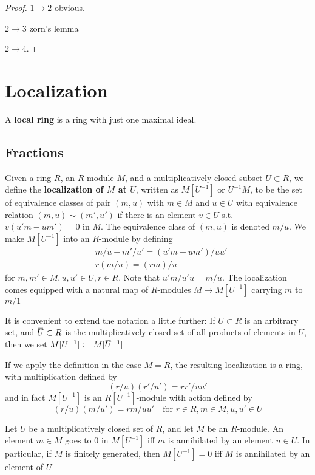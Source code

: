 \documentclass[11pt]{article}
\begin{document}
\begin{proof}
\(1\to 2\) obvious.

\(2\to 3\) zorn's lemma

\(2\to 4\).
\end{proof}
\section{Localization}
\label{sec:orgf3b943d}
A \textbf{local ring} is a ring with just one maximal ideal.
\subsection{Fractions}
\label{sec:orgc443fe5}
Given a ring \(R\), an \(R\)-module \(M\), and a multiplicatively closed
subset \(U\subset R\), we define the \textbf{localization of \(M\) at \(U\)}, written
as \(M[U^{-1}]\) or \(U^{-1}M\), to be the set of equivalence classes of pair
\((m,u)\) with \(m\in M\) and \(u\in U\) with equivalence relation
\((m,u)\sim (m',u')\) if there is an element \(v\in U\) s.t. \(v(u'm-um')=0\)
in \(M\). The equivalence class of \((m,u)\) is denoted \(m/u\). We make
\(M[U^{-1}]\) into an \(R\)-module by defining
\begin{align*}
&m/u+m'/u'=(u'm+um')/uu'\\
&r(m/u)=(rm)/u
\end{align*}
for \(m,m'\in M,u,u'\in U,r\in R\). Note that \(u'm/u'u=m/u\). The
localization comes equipped with a natural map of \(R\)-modules \(M\to
   M[U^{-1}]\) carrying \(m\) to \(m/1\)

It is convenient to extend the notation a little further: If \(U\subset R\)
is an arbitrary set, and \(\bbar{U}\subset R\)  is the multiplicatively
closed set of all products of elements in \(U\), then we set
\(M[U^{-1}]:=M[\bbar{U}^{-1}]\)

If we apply the definition in the case \(M=R\), the resulting localization is
a ring, with multiplication defined by
\begin{equation*}
(r/u)(r'/u')=rr'/uu'
\end{equation*}
and in fact \(M[U^{-1}]\) is an \(R[U^{-1}]\)-module with action defined by
\begin{equation*}
(r/u)(m/u')=rm/uu'\quad\text{for }r\in R,m\in M,u,u'\in U
\end{equation*}
\begin{proposition}[]
\label{prop2.1}
Let \(U\) be a multiplicatively closed set of \(R\), and let \(M\) be an
\(R\)-module. An element \(m\in M\) goes to 0 in \(M[U^{-1}]\) iff \(m\) is
annihilated by an element \(u\in U\). In particular, if \(M\) is finitely
generated, then \(M[U^{-1}]=0\) iff \(M\) is annihilated by an element of \(U\)
\end{proposition}
\end{document}
